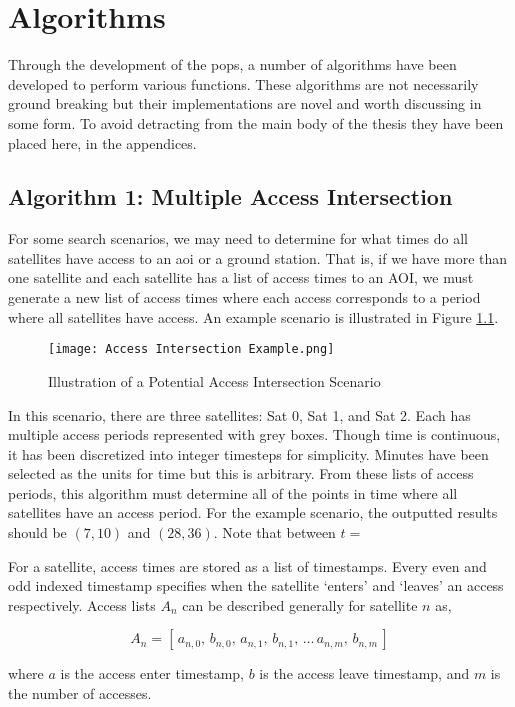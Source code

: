 \glsresetall{} 
\appendix

\chapter{Algorithms}

Through the development of the \gls{pops}, a number of algorithms have been
developed to perform various functions. These algorithms are not necessarily
ground breaking but their implementations are novel and worth discussing in
some form. To avoid detracting from the main body of the thesis they have been
placed here, in the appendices.


\section{Algorithm 1: Multiple Access Intersection} 

For some search scenarios, we may need to determine for what times do all
satellites have access to an \gls{aoi} or a ground station. That is, if we have
more than one satellite and each satellite has a list of access times to an
AOI, we must generate a new list of access times where each access corresponds
to a period where all satellites have access. An  example scenario is
illustrated in Figure \ref{fig:access_intersect}.


\begin{figure}[h]
    \texttt{[image: Access Intersection Example.png]} 
    \caption{Illustration of a Potential Access Intersection Scenario}
\label{fig:access_intersect}
\end{figure}

In this scenario, there are three satellites: Sat 0, Sat 1, and Sat 2. Each has
multiple access periods represented with grey boxes. Though time is continuous,
it has been discretized into integer timesteps for simplicity. Minutes have
been selected as the units for time but this is arbitrary. From these lists of
access periods, this algorithm must determine all of the points in time where
all satellites have an access period. For the example scenario, the outputted
results should be $(7,10)$ and $(28,36)$. Note that between $t = $


For a satellite, access times are stored as a list of timestamps. Every even
and odd indexed timestamp specifies when the satellite `enters' and `leaves' an
access respectively. Access lists $A_n$ can be described generally for satellite $n$ as,

$$
A_n = \left[ \, a_{n,0}, \, b_{n,0}, \, a_{n,1}, \, b_{n,1}, \, \ldots \, a_{n,m}, \, b_{n,m} \, \right]
$$ 

where $a$ is the access enter timestamp, $b$ is the access leave timestamp,
and $m$ is the number of accesses.



